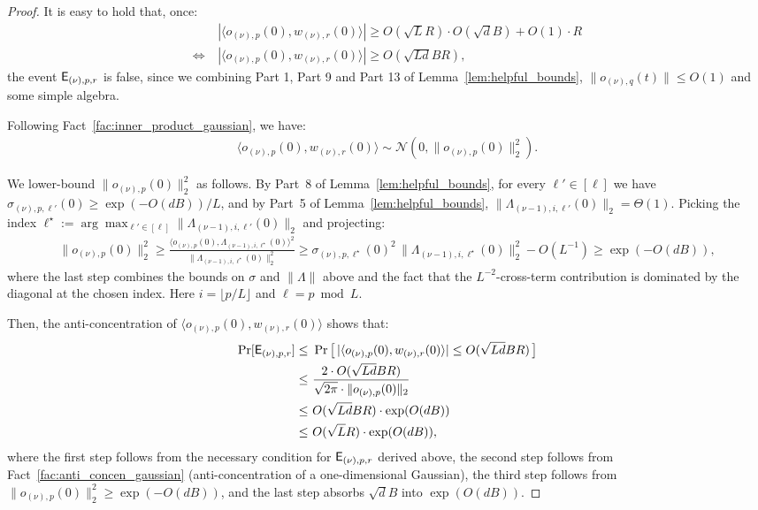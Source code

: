 \documentclass[11pt]{article}
\theoremstyle{plain}
\begin{document}
\begin{proof}
    It is easy to hold that, once:
    \begin{align*}
        & ~ |\langle  o_{(\nu), p}(0), w_{(\nu), r}(0) \rangle| \ge  O(\sqrt{L}R ) \cdot O(\sqrt{d}B) + O(1) \cdot R \\
        \iff & ~ |\langle  o_{(\nu), p}(0), w_{(\nu), r}(0) \rangle| \ge  O(\sqrt{Ld}BR),
    \end{align*}
    the event ${\sf E}_{(\nu), p, r}$ is false, since we combining Part 1, Part 9 and Part 13 of Lemma~\ref{lem:helpful_bounds}, $\|  o_{(\nu), q}(t) \| \leq O(1)$ and some simple algebra.

    Following Fact~\ref{fac:inner_product_gaussian}, we have:
    \begin{align*}
        \langle  o_{(\nu), p}(0), w_{(\nu), r}(0) \rangle \sim \mathcal{N}(0, \|  o_{(\nu), p}(0)\|_2^2).
    \end{align*}

    We lower-bound $\|o_{(\nu),p}(0)\|_2^2$ as follows. By Part~8 of Lemma~\ref{lem:helpful_bounds}, for every $\ell' \in [\ell]$ we have $\sigma_{(\nu),p,\ell'}(0) \ge \exp(-O(dB))/L$, and by Part~5 of Lemma~\ref{lem:helpful_bounds}, $\|\Lambda_{(\nu-1),i,\ell'}(0)\|_2 = \Theta(1)$. Picking the index $\ell^\star := \arg\max_{\ell'\in[\ell]} \|\Lambda_{(\nu-1),i,\ell'}(0)\|_2$ and projecting:
    \begin{align*}
        \|  o_{(\nu), p}(0)\|_2^2 \ge \frac{\langle o_{(\nu),p}(0),\Lambda_{(\nu-1),i,\ell^\star}(0)\rangle^2}{\|\Lambda_{(\nu-1),i,\ell^\star}(0)\|_2^2} \ge \sigma_{(\nu),p,\ell^\star}(0)^2\,\|\Lambda_{(\nu-1),i,\ell^\star}(0)\|_2^2 - O(L^{-1}) \ge \exp(-O(dB)),
    \end{align*}
    where the last step combines the bounds on $\sigma$ and $\|\Lambda\|$ above and the fact that the $L^{-2}$-cross-term contribution is dominated by the diagonal at the chosen index. Here $i = \lfloor p/L\rfloor$ and $\ell = p\bmod L$.
    
    Then, the anti-concentration of $\langle  o_{(\nu), p}(0), w_{(\nu), r}(0) \rangle$ shows that:
    \begin{align*}
        \Pr[{\sf E}_{(\nu), p, r}]
        \leq & ~ \Pr\big[\, |\langle o_{(\nu), p}(0), w_{(\nu), r}(0)\rangle| \leq O(\sqrt{Ld}BR) \,\big] \\
        \leq & ~ \frac{2 \cdot O(\sqrt{Ld}BR)}{\sqrt{2\pi} \cdot \|  o_{(\nu), p}(0)\|_2}  \\
        \leq & ~ O(\sqrt{Ld}BR) \cdot \exp(O(dB)) \\
        \leq & ~ O(\sqrt{L}R) \cdot \exp(O(dB)),
    \end{align*}
    where the first step follows from the necessary condition for ${\sf E}_{(\nu),p,r}$ derived above, the second step follows from Fact~\ref{fac:anti_concen_gaussian} (anti-concentration of a one-dimensional Gaussian), the third step follows from $\| o_{(\nu),p}(0)\|_2^2 \ge \exp(-O(dB))$, and the last step absorbs $\sqrt{d}B$ into $\exp(O(dB))$.


\end{proof}
\end{document}
